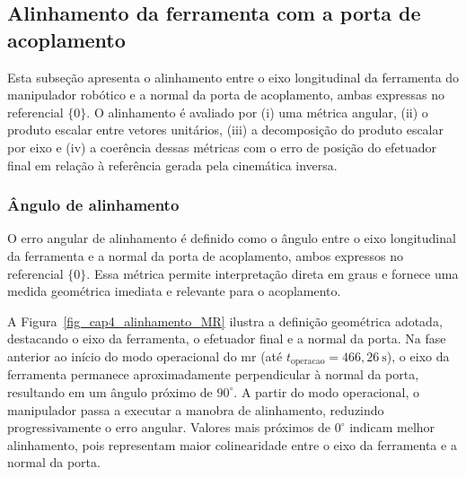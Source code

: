 
\subsection{Alinhamento da ferramenta com a porta de acoplamento}
\label{subsec_cap4_alinhamento}

Esta subseção apresenta o alinhamento entre o eixo longitudinal da ferramenta do manipulador robótico e a normal da porta de acoplamento, ambas expressas no referencial $\{0\}$.
O alinhamento é avaliado por
(i) uma métrica angular,
(ii) o produto escalar entre vetores unitários,
(iii) a decomposição do produto escalar por eixo e
(iv) a coerência dessas métricas com o erro de posição do efetuador final em relação à referência gerada pela cinemática inversa.



\subsubsection{Ângulo de alinhamento}
\label{subsubsec_cap4_alinhamento_angulo}

O erro angular de alinhamento é definido como o ângulo entre o eixo longitudinal da ferramenta e a normal da porta de acoplamento, ambos expressos no referencial $\{0\}$.
Essa métrica permite interpretação direta em graus e fornece uma medida geométrica imediata e relevante para o acoplamento.

A Figura~\ref{fig_cap4_alinhamento_MR} ilustra a definição geométrica adotada, destacando o eixo da ferramenta, o efetuador final e a normal da porta.
Na fase anterior ao início do modo operacional do \gls{mr} (até $t_\text{operacao}=466{,}26~\mathrm{s}$), o eixo da ferramenta permanece aproximadamente perpendicular à normal da porta, resultando em um ângulo próximo de $90^\circ$.
A partir do modo operacional, o manipulador passa a executar a manobra de alinhamento, reduzindo progressivamente o erro angular.
Valores mais próximos de $0^\circ$ indicam melhor alinhamento, pois representam maior colinearidade entre o eixo da ferramenta e a normal da porta.

